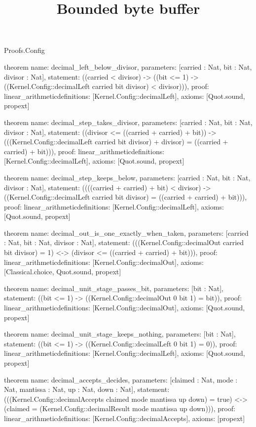 \begin{lexlean}{Proofs.Config}
\title{Bounded byte buffer}
\begin{semanticmodule}
theorem{
  name: decimal_left_below_divisor,
  parameters: [carried : Nat, bit : Nat, divisor : Nat],
  statement: ((carried < divisor) -> ((bit <= 1) -> ((Kernel.Config::decimalLeft carried bit divisor) < divisor))),
  proof: linear_arithmetic{definitions: [Kernel.Config::decimalLeft]},
  axioms: [Quot.sound, propext]
}

theorem{
  name: decimal_step_takes_divisor,
  parameters: [carried : Nat, bit : Nat, divisor : Nat],
  statement: ((divisor <= ((carried + carried) + bit)) -> (((Kernel.Config::decimalLeft carried bit divisor) + divisor) = ((carried + carried) + bit))),
  proof: linear_arithmetic{definitions: [Kernel.Config::decimalLeft]},
  axioms: [Quot.sound, propext]
}

theorem{
  name: decimal_step_keeps_below,
  parameters: [carried : Nat, bit : Nat, divisor : Nat],
  statement: ((((carried + carried) + bit) < divisor) -> ((Kernel.Config::decimalLeft carried bit divisor) = ((carried + carried) + bit))),
  proof: linear_arithmetic{definitions: [Kernel.Config::decimalLeft]},
  axioms: [Quot.sound, propext]
}

theorem{
  name: decimal_out_is_one_exactly_when_taken,
  parameters: [carried : Nat, bit : Nat, divisor : Nat],
  statement: (((Kernel.Config::decimalOut carried bit divisor) = 1) <-> (divisor <= ((carried + carried) + bit))),
  proof: linear_arithmetic{definitions: [Kernel.Config::decimalOut]},
  axioms: [Classical.choice, Quot.sound, propext]
}

theorem{
  name: decimal_unit_stage_passes_bit,
  parameters: [bit : Nat],
  statement: ((bit <= 1) -> ((Kernel.Config::decimalOut 0 bit 1) = bit)),
  proof: linear_arithmetic{definitions: [Kernel.Config::decimalOut]},
  axioms: [Quot.sound, propext]
}

theorem{
  name: decimal_unit_stage_keeps_nothing,
  parameters: [bit : Nat],
  statement: ((bit <= 1) -> ((Kernel.Config::decimalLeft 0 bit 1) = 0)),
  proof: linear_arithmetic{definitions: [Kernel.Config::decimalLeft]},
  axioms: [Quot.sound, propext]
}

theorem{
  name: decimal_accepts_decides,
  parameters: [claimed : Nat, mode : Nat, mantissa : Nat, up : Nat, down : Nat],
  statement: (((Kernel.Config::decimalAccepts claimed mode mantissa up down) = true) <-> (claimed = (Kernel.Config::decimalResult mode mantissa up down))),
  proof: linear_arithmetic{definitions: [Kernel.Config::decimalAccepts]},
  axioms: [propext]
}
\end{semanticmodule}
\end{lexlean}
